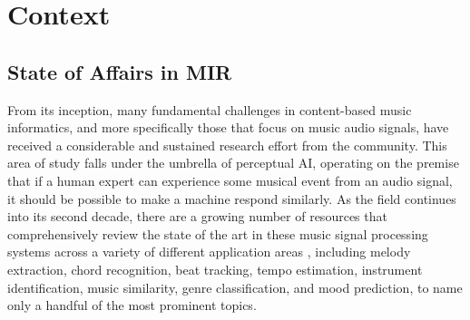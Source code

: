 

\graphicspath{{2/figures/}}

\chapter{Context}
\label{chp:context}



\section{State of Affairs in MIR}



From its inception, many fundamental challenges in content-based music informatics, and more specifically those that focus on music audio signals, have received a considerable and sustained research effort from the community.
This area of study falls under the umbrella of perceptual AI, operating on the premise that if a human expert can experience some musical event from an audio signal, it should be possible to make a machine respond similarly.
As the field continues into its second decade, there are a growing number of resources that comprehensively review the state of the art in these music signal processing systems across a variety of different application areas  \cite{Klapuri2006,Casey2008,Mueller2011a}, including melody extraction, chord recognition, beat tracking, tempo estimation, instrument identification, music similarity, genre classification, and mood prediction, to name only a handful of the most prominent topics.

